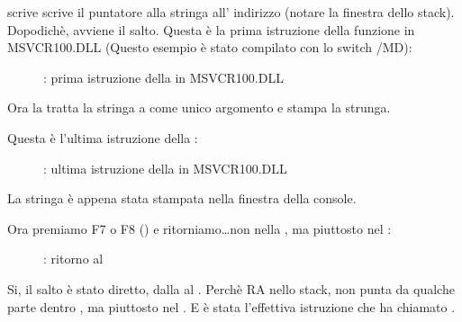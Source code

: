 \clearpage
\MOV scrive scrive il puntatore alla stringa all' indirizzo  (notare la finestra dello stack).
Dopodichè, avviene il salto.
Questa è la prima istruzione della funzione \printf in MSVCR100.DLL (Questo esempio è stato compilato con lo switch /MD): 

\begin{figure}[H]
\centering
{}
\caption{\olly: prima istruzione della \printf in MSVCR100.DLL}
\label{fig:switch_few_olly6}
\end{figure}

Ora la \printf tratta la stringa a  come unico argomento e stampa la strunga.

\clearpage
Questa è l'ultima istruzione della \printf:

\begin{figure}[H]
\centering
{}
\caption{\olly: ultima istruzione della \printf in MSVCR100.DLL}
\label{fig:switch_few_olly7}
\end{figure}

La stringa  è appena stata stampata nella finestra della console.

\clearpage
Ora premiamo F7 o F8 (\stepover) e ritorniamo\dots non nella \ttf , ma piuttosto nel \main:

\begin{figure}[H]
\centering
{}
\caption{\olly: ritorno al \main}
\label{fig:switch_few_olly8}
\end{figure}

Si, il salto è stato diretto, dalla \printf al \main.
Perchè \ac{RA} nello stack, non punta da qualche parte dentro \ttf , ma piuttosto nel \main.
E \CALL {} è stata l'effettiva istruzione che ha chiamato \ttf.

